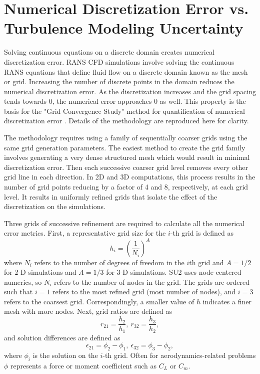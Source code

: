 \section{Numerical Discretization Error vs. Turbulence Modeling Uncertainty}\label{sec:num_vs_turb_error}

Solving continuous equations on a discrete domain creates numerical discretization error.
RANS CFD simulations involve solving the continuous RANS equations that define fluid flow on a discrete domain known as the mesh or grid.
Increasing the number of discrete points in the domain reduces the numerical discretization error.
As the discretization increases and the grid spacing tends towards $0$, the numerical error approaches $0$ as well. 
This property is the basis for the "Grid Convergence Study" method for quantification of numerical discretization error \cite{american_society_of_mechanical_engineers_standard_2009}.
Details of the methodology are reproduced here for clarity.

The methodology requires using a family of sequentially coarser grids using the same grid generation parameters.
The easiest method to create the grid family involves generating a very dense structured mesh which would result in minimal discretization error.
Then each successive coarser grid level removes every other grid line in each direction.
In 2D and 3D computations, this process results in the number of grid points reducing by a factor of 4 and 8, respectively, at each grid level.
It results in uniformly refined grids that isolate the effect of the discretization on the simulations. 

Three grids of successive refinement are required to calculate all the numerical error metrics. 
First, a representative grid size for the $i$-th grid is defined as
\begin{equation} \label{equ:grid_h}
    h_i = \left ( \frac{1}{N_i}\right )^A
\end{equation}
where $N_i$ refers to the number of degrees of freedom in the $i$th grid and $A=1/2$ for 2-D simulations and $A = 1/3$ for 3-D simulations.
SU2 uses node-centered numerics, so $N_i$ refers to the number of nodes in the grid.
The grids are ordered such that $i=1$ refers to the most refined grid (most number of nodes), and $i=3$ refers to the coarsest grid.
Correspondingly, a smaller value of $h$ indicates a finer mesh with more nodes. 
Next, grid ratios are defined as 
\begin{equation}
    r_{21} = \frac{h_2}{h_1},~r_{32} = \frac{h_3}{h_2},
\end{equation}
and solution differences are defined as
\begin{equation}
    \epsilon_{21} = \phi_2 - \phi_1,~\epsilon_{32} = \phi_3 - \phi_2,
\end{equation}
where $\phi_i$ is the solution on the $i$-th grid.
Often for aerodynamics-related problems $\phi$ represents a force or moment coefficient such as $C_L$ or $C_m$.

